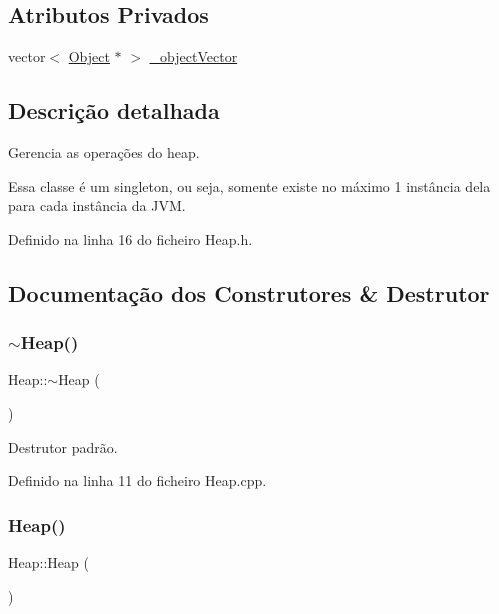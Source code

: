 \subsection*{Atributos Privados}
\begin{DoxyCompactItemize}
\item 
vector$<$ \hyperlink{classObject}{Object} $\ast$ $>$ \hyperlink{classHeap_a55b6cf9504fbe890a49e667c80dae717}{\+\_\+object\+Vector}
\end{DoxyCompactItemize}


\subsection{Descrição detalhada}
Gerencia as operações do heap. 

Essa classe é um singleton, ou seja, somente existe no máximo 1 instância dela para cada instância da J\+VM. 

Definido na linha 16 do ficheiro Heap.\+h.



\subsection{Documentação dos Construtores \& Destrutor}
\mbox{\label{classHeap_a734051272cbd0945d3916a1a89707ba2}} 
\subsubsection{\texorpdfstring{$\sim$\+Heap()}{~Heap()}}
{\footnotesize\ttfamily Heap\+::$\sim$\+Heap (\begin{DoxyParamCaption}{ }\end{DoxyParamCaption})}



Destrutor padrão. 



Definido na linha 11 do ficheiro Heap.\+cpp.

\mbox{\label{classHeap_a6595efd3562a6334d2f5471c2b3b7cb4}} 
\subsubsection{\texorpdfstring{Heap()}{Heap()}\hspace{0.1cm}{\footnotesize\ttfamily [1/2]}}
{\footnotesize\ttfamily Heap\+::\+Heap (\begin{DoxyParamCaption}{ }\end{DoxyParamCaption})\hspace{0.3cm}{\ttfamily [private]}}


